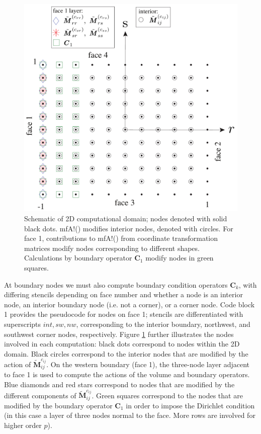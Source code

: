 \begin{figure}
    \centering
    \includegraphics[width=\linewidth]{figures/dots_mod3.pdf}
    \caption{Schematic of 2D computational domain; nodes denoted with solid black dots. {\ttfamily mfA!}() modifies interior nodes, denoted with circles. For face 1, contributions to {\ttfamily mfA!}() from coordinate transformation matrices modify nodes corresponding to different shapes. Calculations by boundary operator $\boldsymbol{C}_1$ modify nodes in green squares.}
    \label{fig:dots}
\end{figure}


At boundary nodes we must also compute boundary condition operators $\boldsymbol{C}_k$, with differing stencils depending on face number and whether a node is an interior node, an interior boundary node (i.e. not a corner), or a corner node. Code block 1 provides the pseudocode for nodes on face 1; stencils are differentiated with superscripts $int, sw, nw$, corresponding to the interior boundary, northwest, and southwest corner nodes, respectively. Figure \ref{fig:dots} further illustrates the nodes involved in each computation: black dots correspond to nodes within the 2D domain. Black circles correspond to the interior nodes that are modified by the action of $\tilde{\boldsymbol{M}}^{c_{ij}}_{ij}$. On the western boundary (face 1), the three-node layer adjacent to face 1 is used to compute the actions of the volume and boundary operators.  Blue diamonds and red stars correspond to nodes that are modified by the different components of $\tilde{\boldsymbol{M}}^{c_{ij}}_{ij}$. Green squares correspond to the nodes that are modified by the boundary operator $\boldsymbol{C}_1$ in order to impose the Dirichlet condition (in this case a layer of three nodes normal to the face. More rows are involved for higher order $p$). 

